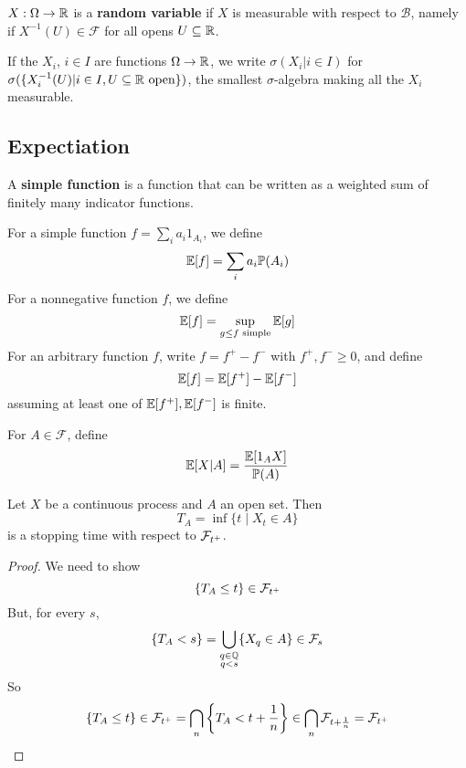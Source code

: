\documentclass{article}
\begin{document}
\begin{defi}
  $X : \Omega \rightarrow \mathbb R$ is a {\bf random variable} if $X$ is measurable with respect to $\mathcal B$, namely if $X^{-1}(U) \in \mathcal F$ for all opens $U \subseteq \mathbb R$.
\end{defi}

If the $X_i$, $i \in I$ are functions $\Omega \rightarrow \mathbb R$, we write $\sigma(X_i | i \in I)$ for $\sigma(\{X_i^{-1}(U) | i \in I, U \subseteq \mathbb R \text{ open}\})$, the smallest $\sigma$-algebra making all the $X_i$ measurable.

\subsection{Expectiation}

\begin{defi}
  A {\bf simple function} is a function that can be written as a weighted sum of finitely many indicator functions.
\end{defi}

\begin{defi}
  For a simple function $f = \sum_i a_i 1_{A_i}$, we define
  $$\mathbb E[f] = \sum_i a_i \mathbb P(A_i)$$
  For a nonnegative function $f$, we define
  $$\mathbb E[f] = \sup_{g \le f \text{ simple}} \mathbb E[g]$$
  For an arbitrary function $f$, write $f = f^+ - f^-$ with $f^+, f^- \ge 0$, and define
  $$\mathbb E[f] = \mathbb E[f^+] - \mathbb E[f^-]$$
  assuming at least one of $\mathbb E[f^+], \mathbb E[f^-]$ is finite.
\end{defi}

\begin{defi}
  For $A \in \mathcal F$, define
  $$\mathbb E[X|A] = \frac{\mathbb E[1_A X]}{\mathbb P(A)}$$
\end{defi}

\newlec

\newlec

\newlec

\newlec

\newlec

\newlec

\newlec

\newlec

\newlec

\newlec

\begin{nprop}
  Let $X$ be a continuous process and $A$ an open set. Then
  $$T_A = \inf \{t \mid X_t \in A\}$$
  is a stopping time with respect to $\mathcal F_{t^+}$.
\end{nprop}
\begin{proof}
  We need to show
  $$\{T_A \le t\} \in \mathcal F_{t^+}$$
  But, for every $s$,
  $$\{T_A < s\} = \bigcup_{\substack{q \in \mathbb Q \\ q < s}} \{X_q \in A\} \in \mathcal F_s$$
  So
  $$\{T_A \le t\} \in \mathcal F_{t^+} = \bigcap_n \left\{ T_A < t + \frac 1n\right\} \in \bigcap_n \mathcal F_{t + \frac 1n} = \mathcal F_{t^+}$$
\end{proof}
\end{document}
